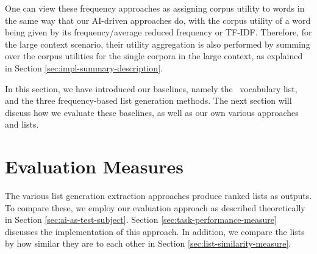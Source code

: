 One can view these frequency approaches as assigning corpus utility to words in the same way that our AI-driven approaches do, with the corpus utility of a word being given by its frequency/average reduced frequency or TF-IDF.
Therefore, for the large context scenario, their utility aggregation is also performed by summing over the corpus utilities for the single corpora in the large context, as explained in Section \ref{sec:impl-summary-description}.

In this section, we have introduced our baselines, namely the \Rosetta\ vocabulary list, and the three frequency-based list generation methods.
The next section will discuss how we evaluate these baselines, as well as our own various approaches and lists.

%
%
%


\section{Evaluation Measures}
The various list generation extraction approaches produce ranked lists as outputs.
To compare these, we employ our evaluation approach as described theoretically in Section \ref{sec:ai-as-test-subject}.
Section \ref{sec:task-performance-measure} discusses the implementation of this approach.
In addition, we compare the lists by how similar they are to each other in Section \ref{sec:list-similarity-measure}.

